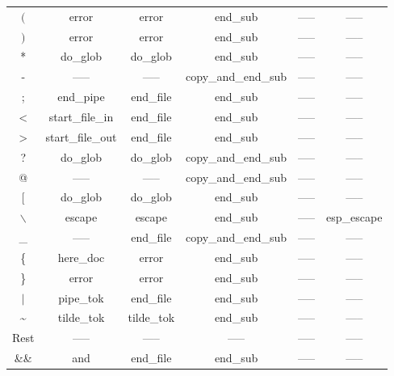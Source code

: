 \documentclass[12pt,a4paper]{report}
\begin{document}
\begin{table}[H]
\begin{tabular}{ |c|c|c|c|c|c| }
	$($ & error \cellcolor[HTML]{FF0044}& error \cellcolor[HTML]{FF0044} & end\_sub \cellcolor[HTML]{FFF49C}& ----- & ----- \\
	$)$ & error \cellcolor[HTML]{FF0044}& error \cellcolor[HTML]{FF0044} & end\_sub \cellcolor[HTML]{FFF49C}& ----- & ----- \\
	* & do\_glob & do\_glob & end\_sub\cellcolor[HTML]{FFF49C} & ----- & ----- \\
	- & ----- & ----- &  copy\_and\_end\_sub \cellcolor[HTML]{FFF49C}& ----- & ----- \\
	; & end\_pipe & end\_file\cellcolor[HTML]{BEE9F9} &  end\_sub \cellcolor[HTML]{FFF49C}& ----- & ----- \\
	< & start\_file\_in \cellcolor[HTML]{BEE9F9}& end\_file\cellcolor[HTML]{BEE9F9}&  end\_sub \cellcolor[HTML]{FFF49C}& ----- & ----- \\
	> & start\_file\_out \cellcolor[HTML]{BEE9F9}& end\_file \cellcolor[HTML]{BEE9F9}&  end\_sub \cellcolor[HTML]{FFF49C}& ----- & ----- \\
	? & do\_glob & do\_glob & copy\_and\_end\_sub \cellcolor[HTML]{FFF49C}& ----- & ----- \\
	@ & ----- & ----- & copy\_and\_end\_sub \cellcolor[HTML]{FFF49C}& ----- & ----- \\
	$[$ & do\_glob & do\_glob &  end\_sub \cellcolor[HTML]{FFF49C}& ----- & ----- \\
	$\backslash$ & escape & escape &  end\_sub \cellcolor[HTML]{FFF49C}& ----- & esp\_escape \\
	\_ & ----- & end\_file \cellcolor[HTML]{BEE9F9}& copy\_and\_end\_sub \cellcolor[HTML]{FFF49C}& ----- & ----- \\
	\{ & here\_doc & error \cellcolor[HTML]{FF0044} &  end\_sub \cellcolor[HTML]{FFF49C}& ----- & ----- \\
	\} & error \cellcolor[HTML]{FF0044} & error \cellcolor[HTML]{FF0044} & end\_sub \cellcolor[HTML]{FFF49C} & ----- & ----- \\
	$|$ & pipe\_tok & end\_file\cellcolor[HTML]{BEE9F9} &  end\_sub \cellcolor[HTML]{FFF49C}& ----- & ----- \\
	\textasciitilde  & tilde\_tok \cellcolor[HTML]{FFF49C}& tilde\_tok \cellcolor[HTML]{FFF49C} &  end\_sub \cellcolor[HTML]{FFF49C}& ----- & ----- \\
	Rest  & ----- & ----- &  ----- & ----- & ----- \\
	\hline
	\&\&  & and & end\_file \cellcolor[HTML]{BEE9F9}&  end\_sub\cellcolor[HTML]{FFF49C} & ----- & ----- \\

\end{tabular}
\end{table}
\end{document}
